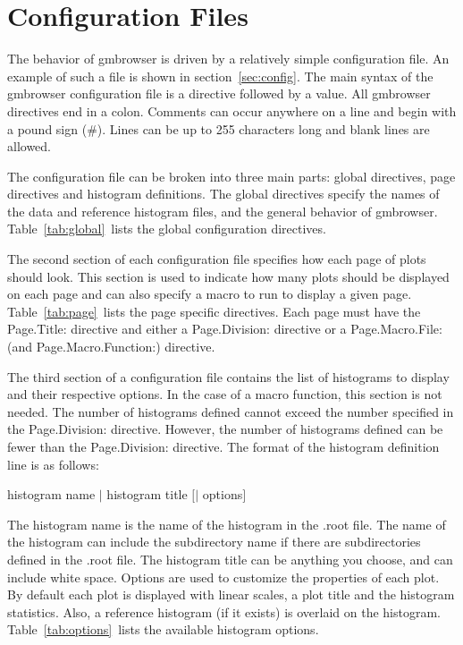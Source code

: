 \documentclass[12pt]{article}
\begin{document}
\section[Configuration Files]{Configuration Files}
The behavior of gmbrowser is driven by a relatively simple 
configuration file. An example of such a file is shown in 
section~\ref{sec:config}.  The main syntax of the 
gmbrowser configuration file is a directive followed by
a value. All gmbrowser directives end in a colon. 
Comments can occur anywhere on a line and begin with a 
pound sign (\#). Lines can be up to 255 characters long and
blank lines are allowed.

The configuration file can be
broken into three main parts: global directives, page directives
and histogram definitions. The global directives specify 
the names of the data and reference histogram files, and
the general behavior of gmbrowser. 
Table~\ref{tab:global}\ lists the global configuration
directives.

The second section of each configuration file specifies 
how each page of plots should look. This section is used
to indicate how many plots should be displayed on each
page and can also specify a macro to run to display a 
given page. 
Table~\ref{tab:page}\ lists the page specific directives.
Each page must have the Page.Title: directive and either
a Page.Division: directive or a Page.Macro.File: (and Page.Macro.Function:)
directive.

The third section of a configuration file contains the list
of histograms to display and their respective options.
In the case of a macro function, this section is not needed.
The number of histograms defined cannot exceed the number
specified in the Page.Division: directive. However, the
number of histograms defined can be fewer than the Page.Division:
directive. The format of the histogram definition line is
as follows:

  \qquad histogram name $|$  histogram title $[|$ options$]$

The histogram name is the name of the histogram
in the .root file. The name of the histogram can include the
subdirectory name if there are subdirectories defined in the
.root file. The histogram
title can be anything you choose, and can include white space. 
Options are used to customize the properties of each plot.
By default each plot is displayed with linear scales, a
plot title and the histogram statistics. Also, a reference
histogram (if it exists) is overlaid on the histogram.
Table~\ref{tab:options}\ lists the available histogram options.
\end{document}
